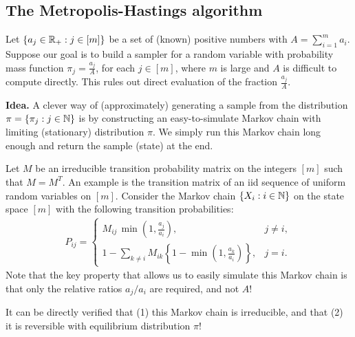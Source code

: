 \documentclass[a4paper,10pt,english]{article}
\begin{document}



\subsection{The Metropolis-Hastings algorithm}
Let $\{a_j \in \mathbb{R}_+: j \in [m]\}$ be a set of (known) positive numbers with $A=\sum_{i=1}^{m}a_i$. 
Suppose our goal is to build a sampler for a random variable with probability mass function $\pi_j = \frac{a_j}{A}$, for each $j \in [m]$, where  $m$ is large and $A$ is difficult to compute directly. 
This rules out direct evaluation of the fraction $\frac{a_j}{A}$. 

{\bf Idea.} 
A clever way of (approximately) generating a sample from the distribution $\pi = \{\pi_j: j \in \mathbb{N}\}$ is by constructing an easy-to-simulate Markov chain with limiting (stationary) distribution $\pi$. 
We simply run this Markov chain long enough and return the sample (state) at the end.  

Let $M$ be an irreducible transition probability matrix on the integers $[m]$ such that $M = M^T$. 
An example is the transition matrix of an iid sequence of uniform random variables on $[m]$.  
Consider the Markov chain $\{X_i: i \in \mathbb{N}\}$ on the state space $[m]$ with the following transition probabilities:
\begin{align*}
P_{ij} = \begin{cases}
       M_{ij} \, \min\left(1,\frac{a_j}{a_i}\right), & j \neq i,\\
       1 - \sum_{k \neq i}M_{ik}\left\{1-\min\left(1,\frac{a_k}{a_i}\right)\right\}, & j = i.
     \end{cases}
\end{align*} 
Note that the key property that allows us to easily simulate this Markov chain is that only the relative ratios $a_j/a_i$ are required, and not $A$!

It can be directly verified that (1) this Markov chain is irreducible, and that (2) it is reversible with equilibrium distribution $\pi$!
\end{document}
